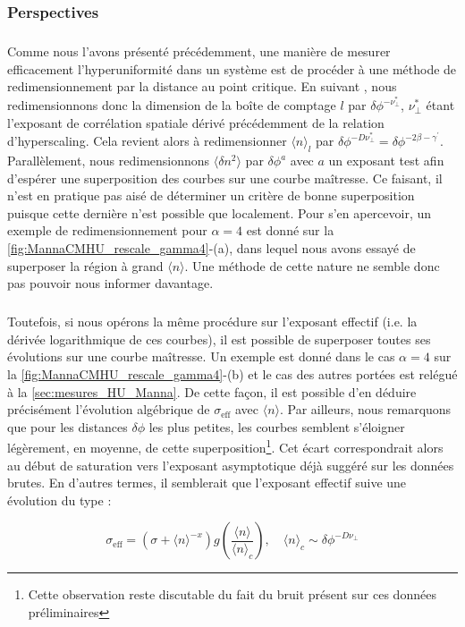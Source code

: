 \subsubsection{Perspectives}

\subparagraph{}Comme nous l'avons présenté précédemment, une manière de mesurer efficacement l'hyperuniformité dans un système est de procéder à une méthode de redimensionnement par la distance au point critique. En suivant \cite{hexner_hyperuniformity_2015}, nous redimensionnons donc la dimension de la boîte de comptage $l$ par $\delta\phi^{-\nu_\perp^*}$, $\nu_\perp^*$ étant l'exposant de corrélation spatiale dérivé précédemment de la relation d'hyperscaling. Cela revient alors à redimensionner $\langle n \rangle_l$ par $\delta\phi^{-D \nu_\perp^*} = \delta\phi^{-2\beta-\gamma^\prime}$. Parallèlement, nous redimensionnons $\langle \delta n^2 \rangle$ par $\delta\phi^a$ avec $a$ un exposant test afin d'espérer une superposition des courbes sur une courbe maîtresse. Ce faisant, il n'est en pratique pas aisé de déterminer un critère de bonne superposition puisque cette dernière n'est possible que localement. Pour s'en apercevoir, un exemple de redimensionnement pour $\alpha=4$ est donné sur la \autoref{fig:MannaCMHU_rescale_gamma4}-(a), dans lequel nous avons essayé de superposer la région à grand $\langle n \rangle$. Une méthode de cette nature ne semble donc pas pouvoir nous informer davantage.

\subparagraph{}Toutefois, si nous opérons la même procédure sur l'exposant effectif (i.e. la dérivée logarithmique de ces courbes), il est possible de superposer toutes ses évolutions sur une courbe maîtresse. Un exemple est donné dans le cas $\alpha=4$ sur la \autoref{fig:MannaCMHU_rescale_gamma4}-(b) et le cas des autres portées est relégué à la \autoref{sec:mesures_HU_Manna}. De cette façon, il est possible d'en déduire précisément l'évolution algébrique de $\sigma_\text{eff}$ avec $\langle n \rangle$. Par ailleurs, nous remarquons que pour les distances $\delta\phi$ les plus petites, les courbes semblent s'éloigner légèrement, en moyenne, de cette superposition\footnote{Cette observation reste discutable du fait du bruit présent sur ces données préliminaires}. Cet écart correspondrait alors au début de saturation vers l'exposant asymptotique déjà suggéré sur les données brutes. En d'autres termes, il semblerait que l'exposant effectif suive une évolution du type :

\begin{equation}
	\sigma_\text{eff}  = \left( \sigma + \langle n \rangle^{-x} \right)g\left( \frac {\langle n \rangle }{\langle n \rangle_c} \right), \quad \langle n \rangle_c \sim \delta\phi^{-D\nu_\perp}
	\label{eq:esposantHULoi}
\end{equation}

